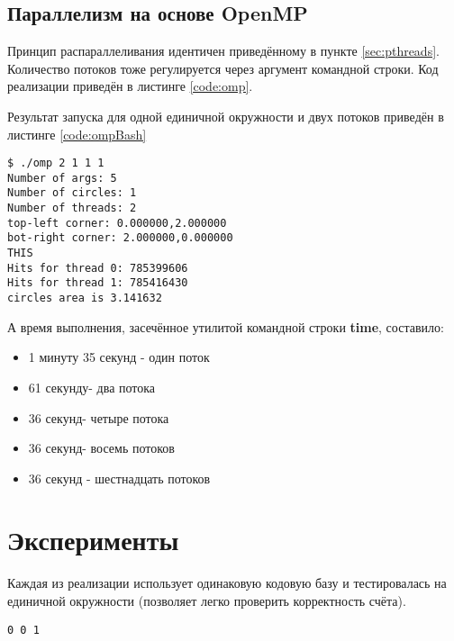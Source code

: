 \subsection{Параллелизм на основе OpenMP}
Принцип распараллеливания идентичен приведённому в пункте \ref{sec:pthreads}. Количество потоков тоже регулируется через аргумент командной строки. Код реализации приведён в листинге \ref{code:omp}.


\parindent=1cm %

Результат запуска для одной единичной окружности и двух потоков приведён в листинге \ref{code:ompBash}

\begin{lstlisting}[label=code:ompBash]
$ ./omp 2 1 1 1
Number of args: 5
Number of circles: 1
Number of threads: 2
top-left corner: 0.000000,2.000000
bot-right corner: 2.000000,0.000000
THIS
Hits for thread 0: 785399606
Hits for thread 1: 785416430
circles area is 3.141632
\end{lstlisting}

А время выполнения, засечённое утилитой командной строки \textbf{time}, составило:
\begin{itemize}
\item 1 минуту 35 секунд - один поток
\item 61 секунду- два потока
\item 36 секунд- четыре потока
\item 36 секунд- восемь потоков
\item 36 секунд - шестнадцать потоков
\end{itemize}

\newpage

\section{Эксперименты}
Каждая из реализации использует одинаковую кодовую базу и тестировалась на единичной окружности (позволяет легко проверить корректность счёта).
\begin{lstlisting}[caption={Набор данных}, label={lst:input1}]
0 0 1
\end{lstlisting}


